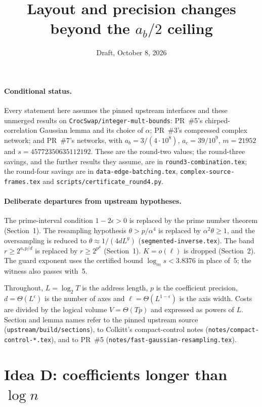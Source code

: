 \documentclass[11pt]{article}
\title{Layout and precision changes beyond the $a_b/2$ ceiling}
\date{Draft, October 8, 2026}
\theoremstyle{remark}\newtheorem*{remark}{Remark}
\begin{document}
\maketitle

\paragraph{Conditional status.} Every statement here assumes the pinned upstream interfaces and these unmerged results on \texttt{CrocSwap/integer-mult-bounds}: PR~\#5's chirped-correlation Gaussian lemma and its choice of $\alpha$; PR~\#3's compressed complex network; and PR~\#7's networks, with $a_b=3/(4\cdot10^8)$, $a_c=39/10^9$, $m=21952$ and $s=45772350635112192$. These are the round-two values; the round-three savings, and the further results they assume, are in \texttt{round3-combination.tex}; the round-four savings are in \texttt{data-edge-batching.tex}, \texttt{complex-source-frames.tex} and \texttt{scripts/certificate\_round4.py}.

\paragraph{Deliberate departures from upstream hypotheses.} The prime-interval condition $1-2\epsilon>0$ is replaced by the prime number theorem (Section~1). The resampling hypothesis $\theta>p/\alpha^4$ is replaced by $\alpha^2\theta\ge1$, and the oversampling is reduced to $\theta\approx1/(4dL^y)$ (\texttt{segmented-inverse.tex}). The band $r\ge2^{a_rp/d}$ is replaced by $r\ge2^{p^\mu}$ (Section~1). $K=o(\ell)$ is dropped (Section~2). The guard exponent uses the certified bound $\log_ms<3.8376$ in place of~5; the witness also passes with~5.

Throughout, $L=\log_2T$ is the address length, $p$ is the coefficient precision,
$d=\Theta(L^\epsilon)$ is the number of axes and $\ell=\Theta(L^{1-\epsilon})$ is the axis
width. Costs are divided by the logical volume $V=\Theta(Tp)$ and expressed as powers
of $L$. Section and lemma names refer to the pinned upstream source
(\texttt{upstream/build/sections}), to Colkitt's compact-control notes
(\texttt{notes/compact-control-*.tex}), and to PR~\#5 (\texttt{notes/fast-gaussian-resampling.tex}).

\section{Idea D: coefficients longer than $\log n$}
\end{document}
